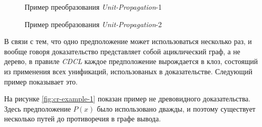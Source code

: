 \begin{figure}
  \begin{prooftree}
  \end{prooftree}
  \caption{Пример преобразования \emph{Unit-Propagation}-1}
  \label{fig:ecr-hard-example-1}
\end{figure}

\begin{figure}
  \begin{prooftree}
  \end{prooftree}
  \caption{Пример преобразования \emph{Unit-Propagation}-2}
  \label{fig:ecr-hard-example-2}
\end{figure}



В связи с тем, что одно предположение может использоваться несколько раз, и вообще говоря доказательство представляет собой ациклический граф, а не дерево, в правиле \emph{CDCL} каждое предположение вырождается в клоз, состоящий из применения всех унификаций, использованых в доказательстве. Следующий пример показывает это.
\begin{example}
\label{exmpl:cr-nonEPR}
На рисунке \ref{fig:cr-example-1} показан пример не древовидного доказательства. Здесь предположение $P(x)$ было использовано дважды, и поэтому существует несколько путей до противоречия в графе вывода.
\end{example}


